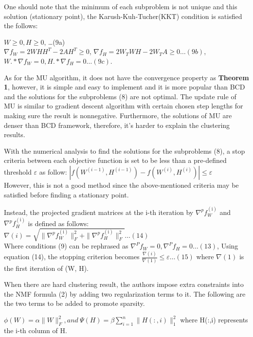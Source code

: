 \documentclass[11pt, oneside]{article}   	%
\begin{document}
\begin{Large}
One should note that the minimum of each subproblem is not unique and this solution (stationary point), the Karush-Kuh-Tucher(KKT) condition is satisfied the follows:
\begin{flushleft}
$W\geq0, H\geq0$, \ldots (9a)\\
$\nabla f_W=2WHH^{T}-2AH^{T}\geq0$, $\nabla f_H=2W_{T}WH-2W_{T}A\geq0 \ldots (9b)$,
$W.\ast\nabla f_W= 0, H.\ast\nabla f_H= 0 \ldots (9c)$.\\
\end{flushleft}

As for the MU algorithm, it does not have the convergence property as \textbf{Theorem 1}, however, it is simple and easy to implement and it is more popular than BCD and the solutions for the subproblems (8) are not optimal.  The update rule of MU is similar to gradient descent algorithm with certain chosen step lengths for making sure the result is nonnegative.  Furthermore, the solutions of MU are denser than BCD framework, therefore, it's harder to explain the clustering results.

With the numerical analysis to find the solutions for the subproblems (8), a stop criteria between each objective function is set to be less than a pre-defined threshold $\varepsilon$ as follow:
$| f(W^{(i-1)},H^{(i-1)}) -f(W^{(i)},H^{(i)}) |\leq \varepsilon$\\

However, this is not a good method since the above-mentioned criteria may be satisfied before finding a stationary point.

Instead, the projected gradient matrices at the i-th iteration by $\nabla^{p} f^{\mathrm{(i)}}_{W} $ and $\nabla^{p} f^{\mathrm{(i)}}_{H} $ is defined as follows:\\
$\nabla(i)=\sqrt{\|\nabla^{p} f^{\mathrm{(i)}}_{W} \|^{\mathrm{2}}_{F} +\|\nabla^{p} f^{\mathrm{(i)}}_{H} \|^{\mathrm{2}}_{F} }\ldots (14)$\\
Where conditions (9) can be rephrased as $\nabla^{P} f_W= 0, \nabla^{P} f_H= 0\ldots(13)$,
Using equation (14), the stopping criterion becomes $\frac{\nabla(i)}{\nabla(1)}\leq\varepsilon \ldots (15)$
where $\nabla(1)$ is the first iteration of (W, H).

When there are hard clustering result, the authors impose extra constraints into the NMF formula (2) by adding two regularization terms to it.  The following are the two terms to be added to promote sparsity.

 $\phi(W)=\alpha\|W\|^{\mathrm{2}}_{F}, and\ \Psi(H)=\beta\sum_{i=1}^n\|H(:,i)\|^{\mathrm{2}}_{1}$
 where H(:,i) represents the i-th column of H.
 

\end{Large}
\end{document}
